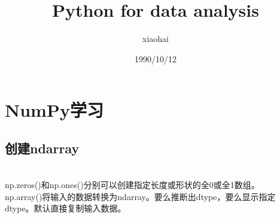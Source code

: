 \documentclass[11pt,UTF8,openany]{ctexbook}
\author{xiaohai}
\date{1990/10/12}
\title{Python for data analysis}
\begin{document}
\maketitle
\tableofcontents

\chapter{NumPy学习}
\section{创建ndarray}
\\
np.zeros()和np.ones()分别可以创建指定长度或形状的全0或全1数组。\\
np.array()将输入的数据转换为ndarray。要么推断出dtype，要么显示指定
dtype。默认直接复制输入数据。\\
\end{document}
